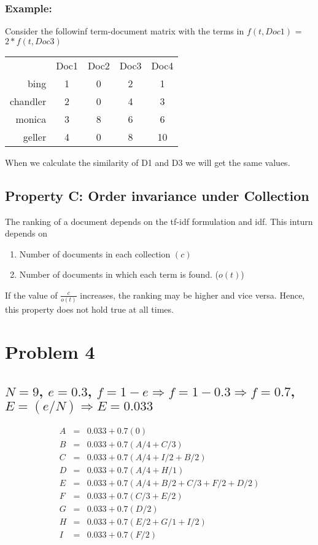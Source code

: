 \documentclass{article}
\begin{document}
\subsubsection{Example:}
Consider the followinf term-document matrix with the terms in $f(t,Doc1)$ = $2 * f(t,Doc3)$

\begin{tabular}{r c c c c}
\multicolumn{1}{r}{}
 & \multicolumn{1}{c}{Doc1}
 & \multicolumn{1}{c}{Doc2}
 & \multicolumn{1}{c}{Doc3}
 & \multicolumn{1}{c}{Doc4} \\
\cline{2-5}
bing & 1 & 0 & 2 & 1 \\
\cline{2-5}
chandler & 2 & 0 & 4 & 3 \\
\cline{2-5}
monica & 3 & 8 & 6 & 6 \\
\cline{2-5}
geller & 4 & 0 & 8 & 10 \\
\cline{2-5}
\end{tabular}
When we calculate the similarity of D1 and D3 we will get the same values.

\subsection{\textbf{Property C\@: Order invariance under Collection}} 

The ranking of a document depends on the tf-idf formulation and idf.  This inturn depends on
\begin{enumerate}
	\item Number of documents in each collection $(c)$
	\item Number of documents in which each term is found. ($o(t)$)
\end{enumerate} 

If the value of $ \frac{c}{o(t)} $ increases, the ranking may be higher and vice versa.  Hence, this property does not hold true at all times.

\section[D]{Problem 4}
\subsection{$N = 9$, $e = 0.3$, $f = 1 - e \Rightarrow f = 1 - 0.3 \Rightarrow f = 0.7$, $E = (e/N) \Rightarrow E = 0.033$}
\[
\begin{array}{rcl}A & = & 0.033 + 0.7(0)\\ B & = & 0.033 + 0.7(A/4 + C/3) \\ C & = & 0.033 + 0.7(A/4 + I/2 + B/2) \\ D & = & 0.033 + 0.7(A/4 + H/1) \\ E & = &0.033 + 0.7(A/4+B/2 + C/3 + F/2 + D/2) \\ F & = & 0.033 + 0.7(C/3 + E/2) \\ G & = & 0.033 + 0.7(D/2) \\ H & = & 0.033 + 0.7(E/2 + G/1 + I/2) \\ I & = & 0.033 + 0.7(F/2)
\end{array}
\]
\end{document}

